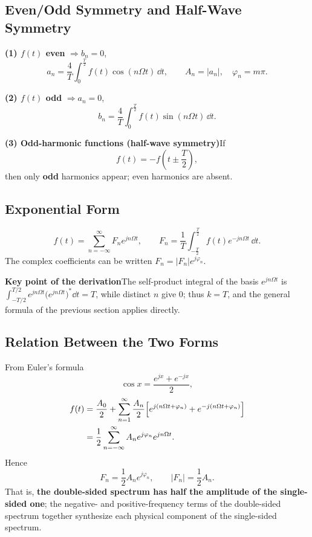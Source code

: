 \subsection{Even/Odd Symmetry and Half-Wave Symmetry}

\textbf{(1) $f(t)$ even} $\Rightarrow b_n=0$,
\[
    a_n=\frac{4}{T}\int_0^{\frac{T}{2}}f(t)\cos(n\Omega t)\,\dd t,\qquad
    A_n=|a_n|,\quad \varphi_n=m\pi .
\]

\textbf{(2) $f(t)$ odd} $\Rightarrow a_n=0$,
\[
    b_n=\frac{4}{T}\int_0^{\frac{T}{2}}f(t)\sin(n\Omega t)\,\dd t .
\]

\textbf{(3) Odd-harmonic functions (half-wave symmetry)}\quad If
\[
    f(t)=-f\!\left(t\pm\frac{T}{2}\right),
\]
then only \textbf{odd} harmonics appear; even harmonics are absent.

\subsection{Exponential Form}

\begin{equation}
    f(t)=\sum_{n=-\infty}^{\infty}F_n e^{jn\Omega t},
    \qquad
    F_n=\frac{1}{T}\int_{-\frac{T}{2}}^{\frac{T}{2}}f(t)e^{-jn\Omega t}\,\dd t .
\end{equation}
The complex coefficients can be written $F_n=|F_n|e^{j\varphi_n}$.

\begin{note}
\textbf{Key point of the derivation}\quad The self-product integral of the
basis $e^{jn\Omega t}$ is
$\int_{-T/2}^{T/2}e^{jn\Omega t}\bigl(e^{jn\Omega t}\bigr)^{*}\dd t=T$,
while distinct $n$ give $0$; thus $k=T$, and the general formula of the
previous section applies directly.
\end{note}

\subsection{Relation Between the Two Forms}

From Euler's formula
\[
    \cos x=\frac{e^{jx}+e^{-jx}}{2},
\]
\[
\begin{aligned}
    f(t)&=\frac{A_0}{2}+\sum_{n=1}^{\infty}\frac{A_n}{2}
          \Bigl[e^{j(n\Omega t+\varphi_n)}+e^{-j(n\Omega t+\varphi_n)}\Bigr]\\
        &=\frac{1}{2}\sum_{n=-\infty}^{\infty}A_n e^{j\varphi_n}e^{jn\Omega t}.
\end{aligned}
\]
Hence
\[
    F_n=\frac{1}{2}A_n e^{j\varphi_n},\qquad |F_n|=\frac{1}{2}A_n .
\]
That is, \textbf{the double-sided spectrum has half the amplitude of the
single-sided one}; the negative- and positive-frequency terms of the
double-sided spectrum together synthesize each physical component of the
single-sided spectrum.

